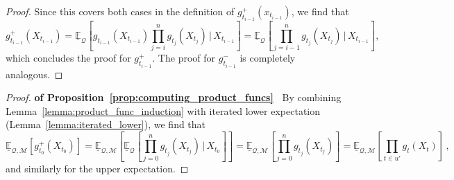 \documentclass[twoside,11pt]{article}
\newcommand{\lexp}{\underline{\mathbb{E}}_{\rateset,\mathcal{M}}}
\newcommand{\rateset}{\mathcal{Q}}
\begin{document}
\begin{proof}
Since this covers both cases in the definition of $g_{t_{i-1}}^+(x_{t_{i-1}})$, we find that
\begin{equation*}
g_{t_{i-1}}^+(X_{t_{i-1}}) = \underline{\mathbb{E}}_{\rateset}\left[g_{t_{i-1}}(X_{t_{i-1}})\prod_{j=i}^{n}g_{t_j}(X_{t_j})\,\Bigg\vert\,X_{t_{i-1}}\right] = \underline{\mathbb{E}}_{\rateset}\left[\prod_{j={i-1}}^{n}g_{t_j}(X_{t_j})\,\Bigg\vert\,X_{t_{i-1}}\right],
\end{equation*}
which concludes the proof for $g_{t_{i-1}}^+$. The proof for $g_{t_{i-1}}^-$ is completely analogous.
\end{proof}

\begin{proof}{\bf of Proposition~\ref{prop:computing_product_funcs}~}
By combining Lemma~\ref{lemma:product_func_induction} with iterated lower expectation (Lemma~\ref{lemma:iterated_lower}), we find that
\begin{equation*}
\lexp\left[g_{t_0}^+(X_{t_0})\right] = \lexp\left[\underline{\mathbb{E}}_{\rateset}\left[\prod_{j=0}^{n}g_{t_j}(X_{t_j})\,\Bigg\vert\,X_{t_0}\right]\right] = \lexp\left[\prod_{j=0}^{n}g_{t_j}(X_{t_j})\right] = \lexp\left[\prod_{t\in u'}g_{t}(X_{t})\right]\,,
\end{equation*}
and similarly for the upper expectation.
\end{proof}
\end{document}
